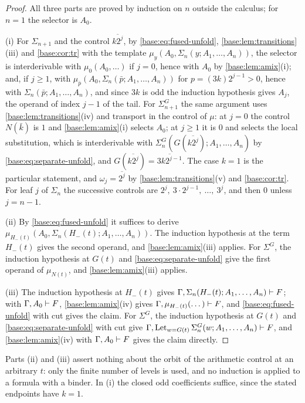 \begin{proof}
All three parts are proved by induction on $n$ outside the calculus; for
$n=1$ the selector is $A_0$.

(i) For $\Sigma_{n+1}$ and the control $\overline{k2^{j}}$, by
\eqref{base:eq:fused-unfold}, \cref{base:lem:transitions}(iii) and
\cref{base:cor:tr} with the template
$\mu_y(A_0,\Sigma_n(y;A_1,\dots,A_n))$, the selector is interderivable with
$\mu_{0}(A_0,\dots)$ if $j=0$, hence with $A_0$ by
\cref{base:lem:amix}(i); and, if $j\ge 1$, with
$\mu_{\bar p}(A_0,\Sigma_n(\bar p;A_1,\dots,A_n))$ for
$p=(3k)2^{j-1}>0$, hence with $\Sigma_n(\bar p;A_1,\dots,A_n)$, and since
$3k$ is odd the induction hypothesis gives $A_j$, the operand of index
$j-1$ of the tail.  For $\Sigma^{G}_{n+1}$ the same argument uses
\cref{base:lem:transitions}(iv) and transport in the control of $\mu$: at
$j=0$ the control $N(\bar k)$ is $1$ and \cref{base:lem:amix}(i) selects
$A_0$; at $j\ge1$ it is $0$ and selects the local substitution, which is
interderivable with $\Sigma^{G}_n(G(\overline{k2^j});A_1,\dots,A_n)$ by
\eqref{base:eq:separate-unfold}, and
$G(\overline{k2^j})=\overline{3k2^{j-1}}$.  The case $k=1$ is the
particular statement, and $\omega_j=\overline{2^j}$ by
\cref{base:lem:transitions}(v) and \cref{base:cor:tr}.  For leaf $j$ of
$\Sigma_n$ the successive controls are
$2^j,\ 3\cdot2^{j-1},\ \dots,\ 3^j$, and then $0$ unless $j=n-1$.

(ii) By \eqref{base:eq:fused-unfold} it suffices to derive
$\mu_{H_-(t)}(A_0,\Sigma_n(H_-(t);A_1,\dots,A_n))$.  The induction
hypothesis at the term $H_-(t)$ gives the second operand, and
\cref{base:lem:amix}(iii) applies.  For $\Sigma^{G}$, the induction
hypothesis at $G(t)$ and \eqref{base:eq:separate-unfold} give the first
operand of $\mu_{N(t)}$, and \cref{base:lem:amix}(iii) applies.

(iii) The induction hypothesis at $H_-(t)$ gives
$\Gamma,\Sigma_n(H_-(t);A_1,\dots,A_n)\vdash F$; with $\Gamma,A_0\vdash F$,
\cref{base:lem:amix}(iv) gives $\Gamma,\mu_{H_-(t)}(\dots)\vdash F$, and
\eqref{base:eq:fused-unfold} with cut gives the claim.  For $\Sigma^{G}$, the
induction hypothesis at $G(t)$ and \eqref{base:eq:separate-unfold} with cut
give $\Gamma,\operatorname{Let}_{w=G(t)}\Sigma^{G}_n(w;A_1,\dots,A_n)\vdash F$,
and \cref{base:lem:amix}(iv) with $\Gamma,A_0\vdash F$ gives the claim
directly.
\end{proof}

Parts (ii) and (iii) assert nothing about the orbit of the arithmetic
control at an arbitrary $t$: only the finite number of levels is used, and
no induction is applied to a formula with a binder.  In (i) the closed odd
coefficients suffice, since the stated endpoints have $k=1$.

